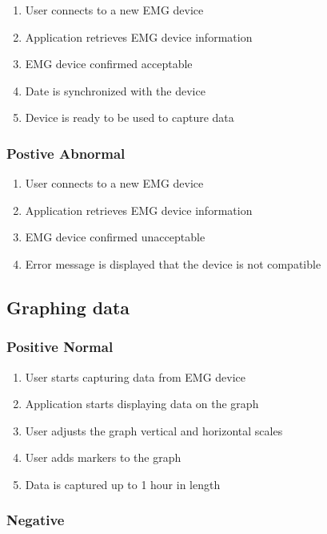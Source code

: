\documentclass[12pt,a4paper]{article}
\begin{document}
\begin{enumerate}
	\item User connects to a new EMG device
	\item Application retrieves EMG device information
	\item EMG device confirmed acceptable
	\item Date is synchronized with the device
	\item Device is ready to be used to capture data
\end{enumerate}

\subsubsection{Postive Abnormal}

\begin{enumerate}
	\item User connects to a new EMG device
	\item Application retrieves EMG device information
	\item EMG device confirmed unacceptable
	\item Error message is displayed that the device is not compatible 
\end{enumerate}

\subsection{Graphing data}

\subsubsection{Positive Normal}

\begin{enumerate}
	\item User starts capturing data from EMG device
	\item Application starts displaying data on the graph
	\item User adjusts the graph vertical and horizontal scales
	\item User adds markers to the graph
	\item Data is captured up to 1 hour in length
\end{enumerate}

\subsubsection{Negative}
\end{document}
